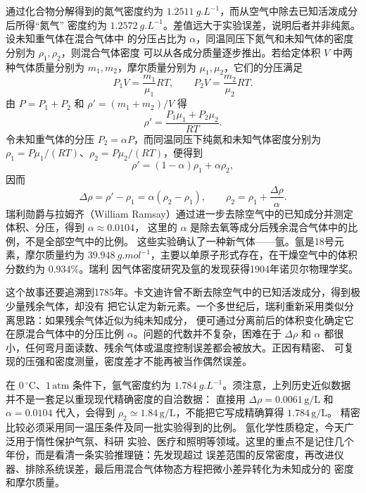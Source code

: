 {通过化合物分解得到的氮气密度约为 $\SI{1.2511}{g.L^{-1}}$，而从空气中除去已知活泼成分后所得“氮气”
密度约为 $\SI{1.2572}{g.L^{-1}}$。差值远大于实验误差，说明后者并非纯氮。设未知重气体在混合气体中
的分压占比为 $\alpha$，同温同压下氮气和未知气体的密度分别为 $\rho_1,\rho_2$，则混合气体密度
可以从各成分质量逐步推出。若给定体积 $V$ 中两种气体质量分别为 $m_1,m_2$，摩尔质量分别为
$\mu_1,\mu_2$，它们的分压满足
\begin{equation}
  P_1V=\frac{m_1}{\mu_1}RT,
  \qquad
  P_2V=\frac{m_2}{\mu_2}RT.
\end{equation}
由 $P=P_1+P_2$ 和 $\rho'=(m_1+m_2)/V$ 得
\begin{equation}
  \rho'=\frac{P_1\mu_1+P_2\mu_2}{RT}.
\end{equation}
令未知重气体的分压 $P_2=\alpha P$，而同温同压下纯氮和未知气体密度分别为
$\rho_1=P\mu_1/(RT)$、$\rho_2=P\mu_2/(RT)$，便得到
\begin{equation}
  \rho'=(1-\alpha)\rho_1+\alpha\rho_2,
\end{equation}
因而
\begin{equation}
  \Delta\rho=\rho'-\rho_1=\alpha(\rho_2-\rho_1),
  \qquad
  \rho_2=\rho_1+\frac{\Delta\rho}{\alpha}.
\end{equation}
瑞利勋爵与拉姆齐（William Ramsay）通过进一步去除空气中的已知成分并测定体积、分压，得到 $\alpha\approx0.0104$，
这里的 $\alpha$ 是除去氧等成分后残余混合气体中的比例，不是全部空气中的比例。
这些实验确认了一种新气体——氩。氩是18号元素，摩尔质量约为
$\SI{39.948}{g.mol^{-1}}$，主要以单原子形式存在，在干燥空气中的体积分数约为 $0.934\%$。瑞利
因气体密度研究及氩的发现获得1904年诺贝尔物理学奖。

这个故事还要追溯到1785年。卡文迪许曾不断去除空气中的已知活泼成分，得到极少量残余气体，却没有
把它认定为新元素。一个多世纪后，瑞利重新采用类似分离思路：如果残余气体近似为纯未知成分，
便可通过分离前后的体积变化确定它在原混合气体中的分压比例 $\alpha$。问题的代数并不复杂，困难在于
$\Delta\rho$ 和 $\alpha$ 都很小，任何弯月面读数、残余气体或温度控制误差都会被放大。正因有精密、
可复现的压强和密度测量，密度差才不能再被当作偶然误差。

在 $0\,{}^\circ\mathrm C$、$1\,\mathrm{atm}$ 条件下，氩气密度约为 $\SI{1.784}{g.L^{-1}}$。须注意，上列历史近似数据并不是一套足以重现现代精确密度的自洽数据：
直接用 $\Delta\rho=0.0061\,\mathrm{g/L}$ 和 $\alpha=0.0104$ 代入，会得到
$\rho_2\simeq1.84\,\mathrm{g/L}$，不能把它写成精确算得 $1.784\,\mathrm{g/L}$。
精密比较必须采用同一温压条件及同一批实验得到的比例。
氩化学性质稳定，今天广泛用于惰性保护气氛、科研
实验、医疗和照明等领域。这里的重点不是记住几个年份，而是看清一条实验推理链：先发现超过
误差范围的反常密度，再改进仪器、排除系统误差，最后用混合气体物态方程把微小差异转化为未知成分的
密度和摩尔质量。

}
